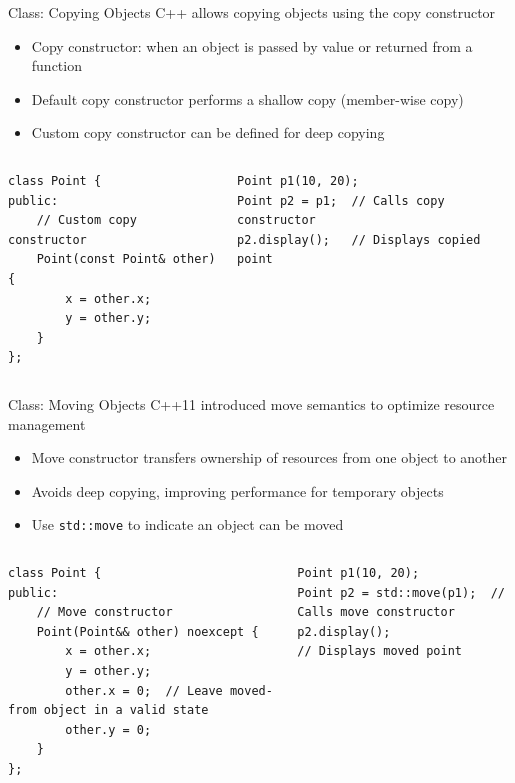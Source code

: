 \begin{frame}[fragile]{Class: Copying Objects}
	C++ allows copying objects using the copy constructor
	\begin{itemize}
		\item Copy constructor: when an object is passed by value or returned from a function
		\item Default copy constructor performs a shallow copy (member-wise copy)
		\item Custom copy constructor can be defined for deep copying
	\end{itemize}

	\begin{columns}
		\begin{column}{0.5\textwidth}
			\begin{verbatim}
class Point {
public:
    // Custom copy constructor
    Point(const Point& other) {
        x = other.x;
        y = other.y;
    }
};
\end{verbatim}
		\end{column}
		\begin{column}{0.5\textwidth}
			\begin{verbatim}
Point p1(10, 20);
Point p2 = p1;  // Calls copy constructor
p2.display();   // Displays copied point
    \end{verbatim}
		\end{column}
	\end{columns}
\end{frame}

\begin{frame}[fragile]{Class: Moving Objects}
	C++11 introduced move semantics to optimize resource management
	\begin{itemize}
		\item Move constructor transfers ownership of resources from one object to another
		\item Avoids deep copying, improving performance for temporary objects
		\item Use \texttt{std::move} to indicate an object can be moved
	\end{itemize}

	\begin{columns}
		\begin{column}{0.5\textwidth}
			\begin{verbatim}
class Point {
public:
    // Move constructor
    Point(Point&& other) noexcept {
        x = other.x;
        y = other.y;
        other.x = 0;  // Leave moved-from object in a valid state
        other.y = 0;
    }
};
\end{verbatim}
		\end{column}
		\begin{column}{0.5\textwidth}
			\begin{verbatim}
Point p1(10, 20);
Point p2 = std::move(p1);  // Calls move constructor
p2.display();               // Displays moved point
            \end{verbatim}
		\end{column}
	\end{columns}
\end{frame}


